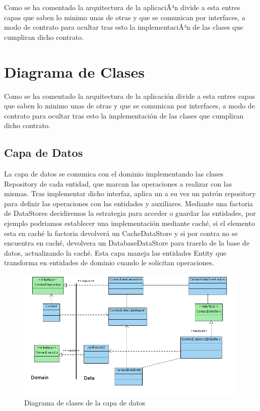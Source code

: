 \documentclass[../pfc.tex]{subfiles}
\begin{document}
	Como se ha comentado la arquitectura de la aplicaciÃ³n divide a esta entres capas que saben lo minimo unas de otras y que se comunican por interfaces, a modo de contrato para ocultar tras esto la implementaciÃ³n de las clases que cumpliran dicho contrato.
	
	\section{Diagrama de Clases}
	
		Como se ha comentado la arquitectura de la aplicación divide a esta entres capas que saben lo minimo unas de otras y que se comunican por interfaces, a modo de contrato para ocultar tras esto la implementación de las clases que cumpliran dicho contrato.
		
	
	\subsection{Capa de Datos}
	
	La capa de datos se comunica con el dominio implementando las clases Repository de cada entidad, que marcan las operaciones a realizar con las mismas. Tras implementar dicho interfaz, aplica un a su vez un patrón repository para definir las operaciones con las entidades y auxiliares. Mediante una factoria de DataStores decidiremos la estrategia para acceder o guardar las entidades, por ejemplo podriamos establecer una implementación mediante caché, si el elemento esta en caché la factoria devolverá un CacheDataStore y si por contra no se encuentra en caché, devolvera un DatabaseDataStore para traerlo de la base de datos, actualizando la caché. Esta capa maneja las entidades Entity que transforma en entidades de dominio cuando le solicitan operaciones. 
		
		\begin{figure}[H]
			\centering
			\includegraphics[width=0.8\linewidth]{../images/DataClasesDiagram}
			\caption{Diagrama de clases de la capa de datos}
			\label{fig:Clases de la capa Data}
		\end{figure}
		
\end{document}
